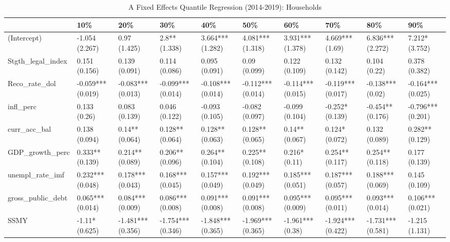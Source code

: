 \begin{table}[ht]
\centering
\caption{A Fixed Effects Quantile Regression (2014-2019): Households} 
\begingroup\small
\begin{tabular}{llllllllll}
  \toprule
 & 10\% & 20\% & 30\% & 40\% & 50\% & 60\% & 70\% & 80\% & 90\% \\ 
  \midrule
(Intercept) & -1.054 (2.267) & 0.97 (1.425) & 2.8** (1.338) & 3.664*** (1.282) & 4.081*** (1.318) & 3.931*** (1.378) & 4.669*** (1.69) & 6.836*** (2.272) & 7.212* (3.752) \\ 
  Stgth\_legal\_index & 0.151 (0.156) & 0.139 (0.091) & 0.114 (0.086) & 0.095 (0.091) & 0.09 (0.099) & 0.122 (0.109) & 0.132 (0.142) & 0.104 (0.22) & 0.378 (0.382) \\ 
  Reco\_rate\_dol & -0.059*** (0.019) & -0.083*** (0.013) & -0.099*** (0.014) & -0.108*** (0.014) & -0.112*** (0.014) & -0.114*** (0.015) & -0.119*** (0.017) & -0.138*** (0.02) & -0.164*** (0.025) \\ 
  infl\_perc & 0.133 (0.26) & 0.083 (0.139) & 0.046 (0.122) & -0.093 (0.105) & -0.082 (0.097) & -0.099 (0.104) & -0.252* (0.139) & -0.454** (0.176) & -0.796*** (0.201) \\ 
  curr\_acc\_bal & 0.138 (0.094) & 0.14** (0.064) & 0.128** (0.064) & 0.128** (0.063) & 0.128** (0.065) & 0.14** (0.067) & 0.124* (0.072) & 0.132 (0.089) & 0.282** (0.129) \\ 
  GDP\_growth\_perc & 0.333** (0.139) & 0.214** (0.089) & 0.206** (0.096) & 0.264** (0.104) & 0.225** (0.108) & 0.216* (0.11) & 0.254** (0.117) & 0.254** (0.118) & 0.177 (0.139) \\ 
  unempl\_rate\_imf & 0.232*** (0.048) & 0.178*** (0.043) & 0.168*** (0.045) & 0.157*** (0.049) & 0.192*** (0.049) & 0.185*** (0.051) & 0.187*** (0.057) & 0.188*** (0.069) & 0.145 (0.109) \\ 
  gross\_public\_debt & 0.065*** (0.014) & 0.084*** (0.009) & 0.086*** (0.008) & 0.091*** (0.008) & 0.091*** (0.008) & 0.095*** (0.009) & 0.095*** (0.011) & 0.093*** (0.014) & 0.106*** (0.021) \\ 
  SSMY & -1.11* (0.625) & -1.481*** (0.356) & -1.754*** (0.346) & -1.848*** (0.365) & -1.969*** (0.365) & -1.961*** (0.38) & -1.924*** (0.422) & -1.731*** (0.581) & -1.215 (1.131) \\ 
   \bottomrule
\end{tabular}
\endgroup
\end{table}
